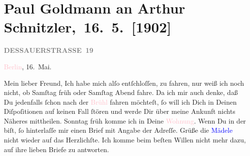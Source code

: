 

\renewcommand{\erwaehntePersonen}{Personen: Olga Schnitzler, Elisabeth Steinrück}
\renewcommand{\erwaehnteOrte}{Orte: Berlin, Brühl, Dessauer Straße, Edmund-Weiß-Gasse, Wien}
\renewcommand{\erwaehnteWerke}{}
\section[ Paul Goldmann an Arthur Schnitzler, 16. 5. {[}1902{]}]{Paul Goldmann an Arthur Schnitzler, 16. 5. {[}1902{]}}
\nopagebreak{}
\rehead{ }\normalsize\beginnumbering{}
\toendnotes[C]{\smallbreak\pagebreak[2]}
\toendnotes[C]{\smallbreak}
\pstart
           \noindent{}\raggedleft{}{\pb}\textcolor{pink}{\textcolor{gray}{\textbf{DESSAUERSTRASSE 19}}}{}\ledrightnote{\textcolor{pink}{Dessauer Straße}}\pend
           
\pstart
           \textcolor{pink}{Berlin}{}\ledrightnote{\textcolor{pink}{Berlin}}, 16. Mai.\pend
           
\pstart\center{}Mein lieber Freund,\pend
\pstart
           Ich habe mich alſo entſchloſſen, zu fahren, nur weiß ich noch nicht, ob Samſtag{ }früh oder Samſtag{ }Abend fahre. Da ich mir auch denke, daß Du jedenfalls ſchon \label{K_L03209-1v}\label{K_L03209-1h} nach der \textcolor{pink}{Brühl}{}\ledrightnote{\textcolor{pink}{Brühl}} fahren möchteſt, ſo will ich Dich in Deinen
               Diſpoſitionen auf keinen Fall ſtören und werde Dir über {\pb}meine Ankunft nichts Näheres mittheilen. Sonntag{ }früh komme ich in Deine \textcolor{pink}{Wohnung}{}\ledrightnote{{$\rightarrow$}\textcolor{pink}{Edmund-Weiß-Gasse}}. Wenn Du in der \label{K_L03209-4v}\label{K_L03209-4h} biſt, ſo hinterlaſſe mir einen Brief
               mit Angabe der Adreſſe. Grüße die \textcolor{blue}{Mädele}{}\ledrightnote{{$\rightarrow$}\textcolor{blue}{Olga Schnitzler}{\newline}{$\rightarrow$}\textcolor{blue}{Elisabeth Steinrück}} nicht wieder auf das Herzlichſte. Ich komme
               beim beſten Willen nicht mehr dazu, auf ihre lieben Briefe zu antworten.\pend
           
